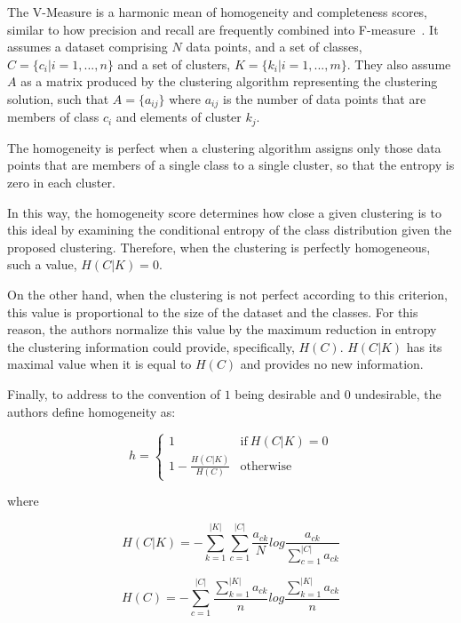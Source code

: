 The V-Measure is a harmonic mean of homogeneity and completeness scores, similar to how precision and recall are frequently combined into F-measure~\cite{van1979information}. It assumes a dataset comprising $N$ data points, and a set of classes, $C = \{c_i|i = 1,..., n\}$ and a set of clusters, $K = \{k_i|i = 1,...,m\}$. They also assume $A$ as a matrix produced by the clustering algorithm representing the clustering solution, such that $A = \{a_{ij}\}$ where $a_{ij}$ is the number of data points that are members of class $c_i$ and elements of cluster $k_j$.

The homogeneity is perfect when a clustering algorithm assigns only those data points that are members of a single class to a single cluster, so that the entropy is zero in each cluster.

In this way, the homogeneity score determines how close a given clustering is to this ideal by examining the conditional entropy of the class distribution given the proposed clustering. 
Therefore, when the clustering is perfectly homogeneous, such a value, $H(C|K) = 0$. 
 
On the other hand, when the clustering is not perfect according to this criterion, this value is proportional to the size of the dataset and the classes.
For this reason, the authors normalize this value by the maximum reduction in entropy the clustering information could provide, specifically, $H(C)$.
$H(C|K)$ has its maximal value when it is equal to $H(C)$ and provides no new information.

Finally, to address to the convention of $1$ being desirable and $0$ undesirable, the authors define homogeneity as:

\begin{equation}
\label{equation:homo}
    h = \begin{cases} 1 & \text{if}\ H(C|K) = 0 \\1-\frac{H(C|K)}{H(C)} & \text{otherwise}\end{cases}
\end{equation}

where

\begin{equation}
    H(C|K) =  -\sum_{k=1}^{|K|}{\sum_{c=1}^{|C|}{\frac{a_{ck}}{N}log\frac{a_{ck}}{\sum_{c=1}^{|C|}{a_{ck}}}}}
\end{equation}

\vspace{1em}

\begin{equation}
    H(C) = -\sum_{c=1}^{|C|}{  \frac{\sum_{k=1}^{|K|}a_{ck}}{n}log \frac{\sum_{k=1}^{|K|}a_{ck}}{n} }
\end{equation}
\vspace{1em}

